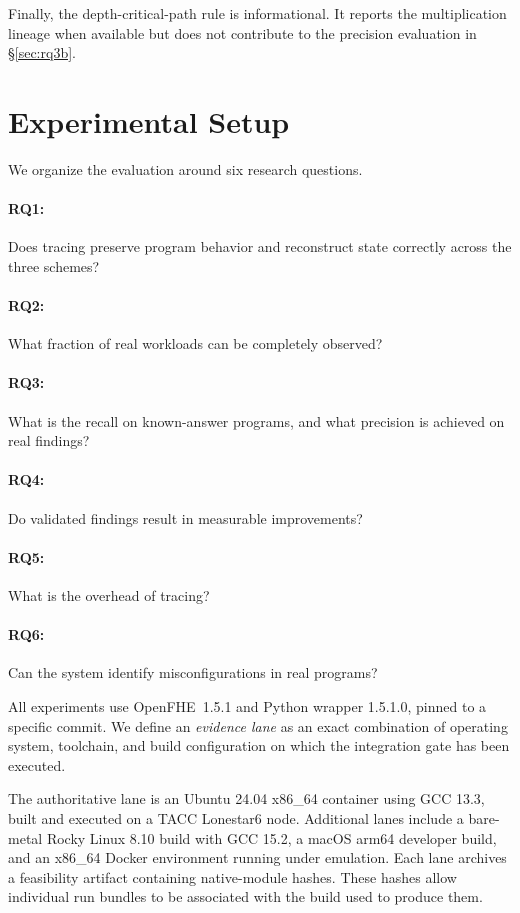 \documentclass[sigconf,nonacm]{acmart}
\begin{document}
Finally, the depth-critical-path rule is informational. It reports the
multiplication lineage when available but does not contribute to the
precision evaluation in \S\ref{sec:rq3b}.

\section{Experimental Setup}
\label{sec:setup}

We organize the evaluation around six research questions.

\paragraph{RQ1:} Does tracing preserve program behavior and reconstruct state
correctly across the three schemes?

\paragraph{RQ2:} What fraction of real workloads can be completely observed?

\paragraph{RQ3:} What is the recall on known-answer programs, and what
precision is achieved on real findings?

\paragraph{RQ4:} Do validated findings result in measurable improvements?

\paragraph{RQ5:} What is the overhead of tracing?

\paragraph{RQ6:} Can the system identify misconfigurations in real programs?

\medskip
\noindent All experiments use OpenFHE~1.5.1 and Python wrapper 1.5.1.0, pinned
to a specific commit. We define an \emph{evidence lane} as an exact
combination of operating system, toolchain, and build configuration on which
the integration gate has been executed.

The authoritative lane is an Ubuntu 24.04 x86\_64 container using GCC 13.3,
built and executed on a TACC Lonestar6 node. Additional lanes include a
bare-metal Rocky Linux 8.10 build with GCC 15.2, a macOS arm64 developer
build, and an x86\_64 Docker environment running under emulation. Each lane
archives a feasibility artifact containing native-module hashes. These hashes
allow individual run bundles to be associated with the build used to produce
them.
\end{document}
